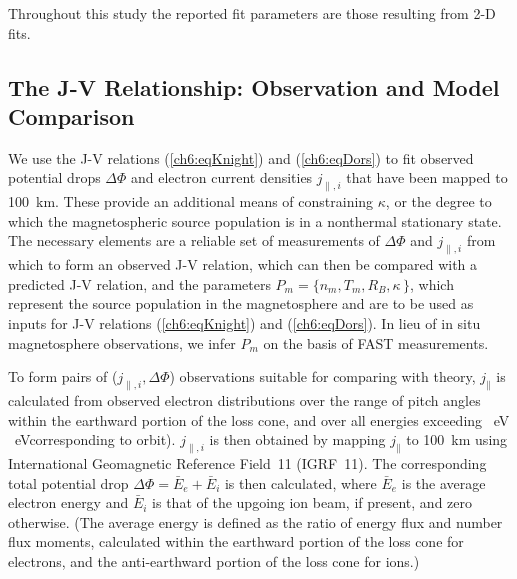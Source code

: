   \DIFaddend Throughout this study
  the reported fit parameters are those resulting from 2-D fits.

  \subsection{The J-V Relationship: Observation and Model Comparison} \label{ssJV}

  We use the J-V relations (\ref{ch6:eqKnight}) and (\ref{ch6:eqDors}) to fit
  observed potential drops $\Delta \Phi$ and electron current densities
  $j_{\parallel,i}$ that have been mapped to 100~km. These \DIFaddbegin {}\DIFaddend provide an
  additional means of constraining $\kappa$, or the degree to which the
  magnetospheric source population is in a nonthermal stationary state\DIFaddbegin {}\DIFaddend . The necessary elements are a
  reliable set of measurements of $\Delta \Phi$ and $j_{\parallel,i}$ from which
  to form an observed J-V relation, which can then be compared with a predicted
  J-V relation, and the parameters $P_m = \{ n_m, T_m, R_B, \kappa \, \}$, which
  represent the source population in the magnetosphere and are to be used as
  inputs for J-V relations (\ref{ch6:eqKnight}) and (\ref{ch6:eqDors}). In lieu
  of in situ magnetosphere observations, we infer $P_m$ on the basis of FAST
  measurements.

  To form pairs of ($j_{\parallel,i}, \Delta \Phi$) observations suitable for
  comparing with theory, $j_\parallel$ is calculated from observed electron
  distributions over the range of pitch angles within the earthward portion of
  the loss cone, and over all energies exceeding \DIFdelbegin {}~eV \DIFdelbegin {}\DIFdelend \DIFaddbegin \DIFadd{(}~eV\DIFdelbegin {}\DIFdelend \DIFaddbegin \DIFadd{) }\DIFaddend corresponding
  to orbit\DIFaddbegin {}). \DIFaddbegin {}\DIFaddend $j_{\parallel,i}$ is then obtained by mapping $j_\parallel$ to 100~km
  using International Geomagnetic Reference Field~11 (IGRF~11). The
  corresponding total potential drop $\Delta \Phi = \bar{E}_e + \bar{E}_i$ is
  then calculated, where $\bar{E}_e$ is the average electron energy and
  $\bar{E}_i$ is that of the upgoing ion beam, if present, and zero
  otherwise. (The average energy is defined as the ratio of energy flux and
  number flux moments, calculated within the earthward portion of the loss cone
  for electrons, and the anti-earthward portion of the loss cone for ions.)


